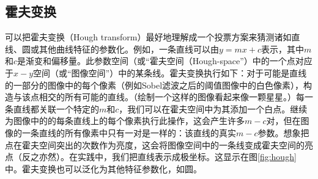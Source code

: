 
\subsection{霍夫变换}
可以把霍夫变换（Hough transform）最好地理解成一个投票方案来猜测诸如直线、圆或其他曲线特征的参数化\cite{duda1972use}。例如，一条直线可以由$y=mx+c$表示，其中$m$和$c$是渐变和偏移量。此参数空间（或“霍夫空间（Hough-space”）中的一个点对应于$x-y$空间（或“图像空间”）中的某条线。霍夫变换执行如下：对于可能是直线的一部分的图像中的每个像素（例如Sobel滤波之后的阈值图像中的白色像素），构造与该点相交的所有可能的直线。（绘制一个这样的图像看起来像一颗星星。）每一条直线都关联一个特定的$m$和$c$，我们可以在霍夫空间中为其添加一个白点。继续为图像中的的每条直线上的每个像素执行此操作，这会产生许多$m-c$对，但在图像的一条直线的所有像素中只有一对是一样的：该直线的真实$m-c$参数。想象把点在霍夫空间突出的次数作为亮度，这会将图像空间中的一条线变成霍夫空间的亮点（反之亦然）。在实践中，我们把直线表示成极坐标。这显示在图\ref{fig:hough}中。霍夫变换也可以泛化为其他特征参数化，如圆。


